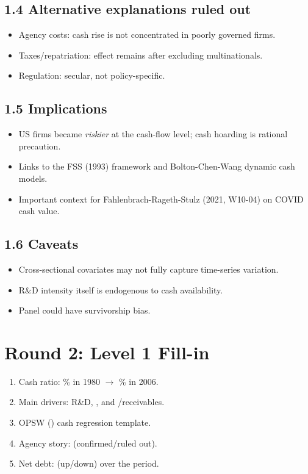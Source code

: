 \documentclass[11pt]{article}
\newcommand{\blank}[1]{\underline{\hspace{#1}}}
\begin{document}
\subsection*{1.4 Alternative explanations ruled out}
\begin{itemize}
\item Agency costs: cash rise is not concentrated in poorly governed firms.
\item Taxes/repatriation: effect remains after excluding multinationals.
\item Regulation: secular, not policy-specific.
\end{itemize}

\subsection*{1.5 Implications}
\begin{itemize}
\item US firms became \emph{riskier} at the cash-flow level; cash hoarding is rational precaution.
\item Links to the FSS (1993) framework and Bolton-Chen-Wang dynamic cash models.
\item Important context for Fahlenbrach-Rageth-Stulz (2021, W10-04) on COVID cash value.
\end{itemize}

\subsection*{1.6 Caveats}
\begin{alertbox}
\begin{itemize}
\item Cross-sectional covariates may not fully capture time-series variation.
\item R\&D intensity itself is endogenous to cash availability.
\item Panel could have survivorship bias.
\end{itemize}
\end{alertbox}

\section*{Round 2: Level 1 Fill-in}
\begin{enumerate}
\item Cash ratio: \blank{1cm}\% in 1980 $\to$ \blank{1cm}\% in 2006.
\item Main drivers: R\&D, \blank{2cm}, and \blank{1cm}/receivables.
\item OPSW (\blank{1cm}) cash regression template.
\item Agency story: \blank{1cm} (confirmed/ruled out).
\item Net debt: \blank{1cm} (up/down) over the period.
\end{enumerate}
\end{document}
